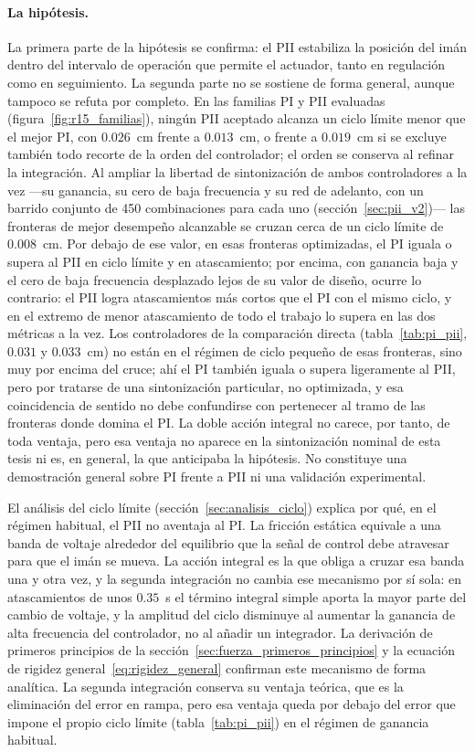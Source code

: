 \paragraph{La hipótesis.}
La primera parte de la hipótesis se confirma: el PII estabiliza la posición del imán dentro del intervalo de operación que permite el actuador, tanto en regulación como en seguimiento. La segunda parte no se sostiene de forma general, aunque tampoco se refuta por completo. En las familias PI y PII evaluadas (figura~\ref{fig:r15_familias}), ningún PII aceptado alcanza un ciclo límite menor que el mejor PI, con $0.026$~cm frente a $0.013$~cm, o frente a $0.019$~cm si se excluye también todo recorte de la orden del controlador; el orden se conserva al refinar la integración. Al ampliar la libertad de sintonización de ambos controladores a la vez —su ganancia, su cero de baja frecuencia y su red de adelanto, con un barrido conjunto de 450 combinaciones para cada uno (sección~\ref{sec:pii_v2})— las fronteras de mejor desempeño alcanzable se cruzan cerca de un ciclo límite de $0.008$~cm. Por debajo de ese valor, en esas fronteras optimizadas, el PI iguala o supera al PII en ciclo límite y en atascamiento; por encima, con ganancia baja y el cero de baja frecuencia desplazado lejos de su valor de diseño, ocurre lo contrario: el PII logra atascamientos más cortos que el PI con el mismo ciclo, y en el extremo de menor atascamiento de todo el trabajo lo supera en las dos métricas a la vez. Los controladores de la comparación directa (tabla~\ref{tab:pi_pii}, $0.031$ y $0.033$~cm) no están en el régimen de ciclo pequeño de esas fronteras, sino muy por encima del cruce; ahí el PI también iguala o supera ligeramente al PII, pero por tratarse de una sintonización particular, no optimizada, y esa coincidencia de sentido no debe confundirse con pertenecer al tramo de las fronteras donde domina el PI. La doble acción integral no carece, por tanto, de toda ventaja, pero esa ventaja no aparece en la sintonización nominal de esta tesis ni es, en general, la que anticipaba la hipótesis. No constituye una demostración general sobre PI frente a PII ni una validación experimental.

El análisis del ciclo límite (sección~\ref{sec:analisis_ciclo}) explica por qué, en el régimen habitual, el PII no aventaja al PI. La fricción estática equivale a una banda de voltaje alrededor del equilibrio que la señal de control debe atravesar para que el imán se mueva. La acción integral es la que obliga a cruzar esa banda una y otra vez, y la segunda integración no cambia ese mecanismo por sí sola: en atascamientos de unos $0.35$~s el término integral simple aporta la mayor parte del cambio de voltaje, y la amplitud del ciclo disminuye al aumentar la ganancia de alta frecuencia del controlador, no al añadir un integrador. La derivación de primeros principios de la sección~\ref{sec:fuerza_primeros_principios} y la ecuación de rigidez general~\eqref{eq:rigidez_general} confirman este mecanismo de forma analítica. La segunda integración conserva su ventaja teórica, que es la eliminación del error en rampa, pero esa ventaja queda por debajo del error que impone el propio ciclo límite (tabla~\ref{tab:pi_pii}) en el régimen de ganancia habitual.

